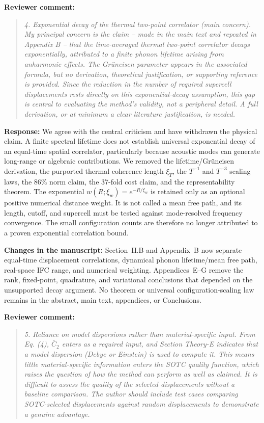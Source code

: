 \documentclass[11pt]{article}
\newcommand{\Question}[1]{\par\medskip\noindent\textbf{Reviewer comment:}\par\begin{quote}\itshape #1\end{quote}}
\newcommand{\Answer}[1]{\par\noindent\color{black}\normalfont\textbf{Response:} #1\par\smallskip}
\newcommand{\Change}[1]{\par\noindent\color{revisionblue}\normalfont\textbf{Changes in the manuscript:} #1\par\color{black}\medskip}
\begin{document}
\Question{4. Exponential decay of the thermal two-point correlator (main concern). My principal concern is the claim -- made in the main text and repeated in Appendix B -- that the time-averaged thermal two-point correlator decays exponentially, attributed to a finite phonon lifetime arising from anharmonic effects. The Gr\"uneisen parameter appears in the associated formula, but no derivation, theoretical justification, or supporting reference is provided. Since the reduction in the number of required supercell displacements rests directly on this exponential-decay assumption, this gap is central to evaluating the method's validity, not a peripheral detail. A full derivation, or at minimum a clear literature justification, is needed.}

\Answer{We agree with the central criticism and have withdrawn the physical claim. A finite spectral lifetime does not establish universal exponential decay of an equal-time spatial correlator, particularly because acoustic modes can generate long-range or algebraic contributions. We removed the lifetime/Gr\"uneisen derivation, the purported thermal coherence length $\xi_T$, the $T^{-1}$ and $T^{-3}$ scaling laws, the 86\% norm claim, the 37-fold cost claim, and the representability theorem. The exponential $w(R;\xi_w)=e^{-R/\xi_w}$ is retained only as an optional positive numerical distance weight. It is not called a mean free path, and its length, cutoff, and supercell must be tested against mode-resolved frequency convergence. The small configuration counts are therefore no longer attributed to a proven exponential correlation bound.}

\Change{Section~II.B and Appendix~B now separate equal-time displacement correlations, dynamical phonon lifetime/mean free path, real-space IFC range, and numerical weighting. Appendices~E--G remove the rank, fixed-point, quadrature, and variational conclusions that depended on the unsupported decay argument. No theorem or universal configuration-scaling law remains in the abstract, main text, appendices, or Conclusions.}

\Question{5. Reliance on model dispersions rather than material-specific input. From Eq. (4), $\bar{C}_2$ enters as a required input, and Section Theory-E indicates that a model dispersion (Debye or Einstein) is used to compute it. This means little material-specific information enters the SOTC quality function, which raises the question of how the method can perform as well as claimed. It is difficult to assess the quality of the selected displacements without a baseline comparison. The author should include test cases comparing SOTC-selected displacements against random displacements to demonstrate a genuine advantage.}
\end{document}
